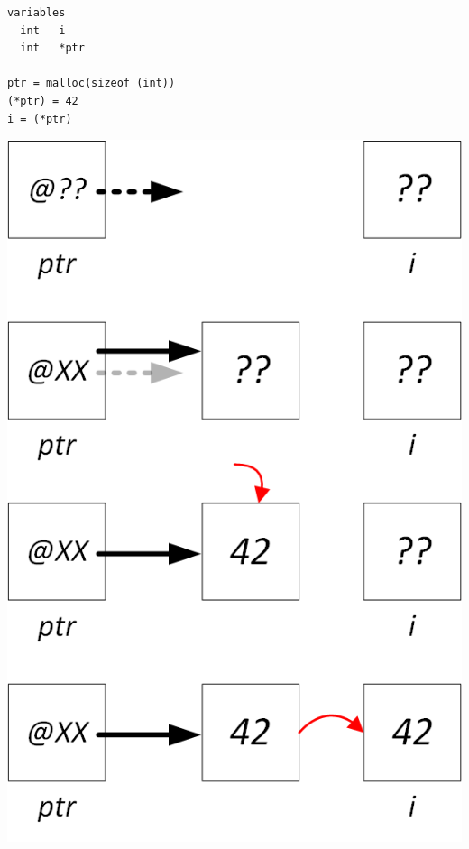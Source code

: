 \documentclass[11pt,a4paper]{article}
\begin{document}
\bigskip

\begin{table}[h!]
  \centering
  \begin{minipage}{0.45\textwidth}
    \centering
\begin{lstlisting}[style=algorithmique]
variables
  int   i
  int   *ptr

ptr = malloc(sizeof (int))
(*ptr) = 42
i = (*ptr) \end{lstlisting}
  \end{minipage}
  \hfillx
  \begin{minipage}{0.5\textwidth}
    \centering
\includegraphics[scale=0.75]{img/pointeurs/pointeurs0_2_dereferencements.png}
  \end{minipage}
\end{table}
\end{document}
